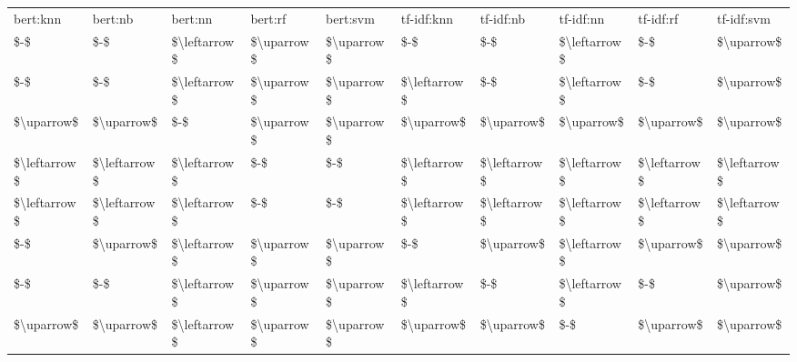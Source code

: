 \begin{tabular}{llllllllll}
\toprule
    bert:knn &      bert:nb &      bert:nn &    bert:rf &   bert:svm &   tf-idf:knn &    tf-idf:nb &    tf-idf:nn &    tf-idf:rf &   tf-idf:svm \\
         \$-\$ &          \$-\$ & \$\textbackslash leftarrow\$ & \$\textbackslash uparrow\$ & \$\textbackslash uparrow\$ &          \$-\$ &          \$-\$ & \$\textbackslash leftarrow\$ &          \$-\$ &   \$\textbackslash uparrow\$ \\
\midrule
         \$-\$ &          \$-\$ & \$\textbackslash leftarrow\$ & \$\textbackslash uparrow\$ & \$\textbackslash uparrow\$ & \$\textbackslash leftarrow\$ &          \$-\$ & \$\textbackslash leftarrow\$ &          \$-\$ &   \$\textbackslash uparrow\$ \\
  \$\textbackslash uparrow\$ &   \$\textbackslash uparrow\$ &          \$-\$ & \$\textbackslash uparrow\$ & \$\textbackslash uparrow\$ &   \$\textbackslash uparrow\$ &   \$\textbackslash uparrow\$ &   \$\textbackslash uparrow\$ &   \$\textbackslash uparrow\$ &   \$\textbackslash uparrow\$ \\
\$\textbackslash leftarrow\$ & \$\textbackslash leftarrow\$ & \$\textbackslash leftarrow\$ &        \$-\$ &        \$-\$ & \$\textbackslash leftarrow\$ & \$\textbackslash leftarrow\$ & \$\textbackslash leftarrow\$ & \$\textbackslash leftarrow\$ & \$\textbackslash leftarrow\$ \\
\$\textbackslash leftarrow\$ & \$\textbackslash leftarrow\$ & \$\textbackslash leftarrow\$ &        \$-\$ &        \$-\$ & \$\textbackslash leftarrow\$ & \$\textbackslash leftarrow\$ & \$\textbackslash leftarrow\$ & \$\textbackslash leftarrow\$ & \$\textbackslash leftarrow\$ \\
         \$-\$ &   \$\textbackslash uparrow\$ & \$\textbackslash leftarrow\$ & \$\textbackslash uparrow\$ & \$\textbackslash uparrow\$ &          \$-\$ &   \$\textbackslash uparrow\$ & \$\textbackslash leftarrow\$ &   \$\textbackslash uparrow\$ &   \$\textbackslash uparrow\$ \\
         \$-\$ &          \$-\$ & \$\textbackslash leftarrow\$ & \$\textbackslash uparrow\$ & \$\textbackslash uparrow\$ & \$\textbackslash leftarrow\$ &          \$-\$ & \$\textbackslash leftarrow\$ &          \$-\$ &   \$\textbackslash uparrow\$ \\
  \$\textbackslash uparrow\$ &   \$\textbackslash uparrow\$ & \$\textbackslash leftarrow\$ & \$\textbackslash uparrow\$ & \$\textbackslash uparrow\$ &   \$\textbackslash uparrow\$ &   \$\textbackslash uparrow\$ &          \$-\$ &   \$\textbackslash uparrow\$ &   \$\textbackslash uparrow\$ \\

\end{tabular}
